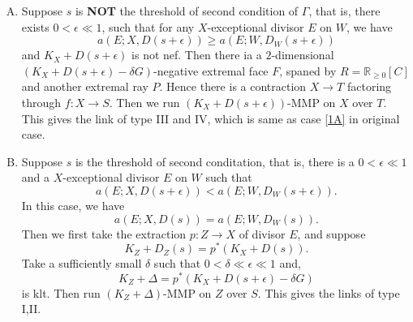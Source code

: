 \documentclass{article}
\begin{document}
\begin{enumerate}[(A)]
  \item Suppose $s$ is \textbf{NOT} the threshold of second condition of $\Gamma$, that is, there exists $0<\epsilon\ll 1$, such that for any $X$-exceptional divisor $E$ on $W$, we have
    \[
      a(E;X,D(s+\epsilon))\geqslant a(E;W,D_{W}(s+\epsilon))
    \]
    and $K_{X}+D(s+\epsilon)$ is not nef. Then there ia a $2$-dimensional $(K_{X}+D(s+\epsilon)-\delta G)$-negative extremal face $F$, spaned by $R=\mathbb{R}_{\geqslant 0}[C]$ and another extremal ray $P$. Hence there is a contraction $X\to T$ factoring through $f:X\to S$. Then we run $(K_{X}+D(s+\epsilon))$-MMP on $X$ over $T$. This gives the link of type III and IV, which is same as case \ref{1A} in original case.
  \item Suppose $s$ is the threshold of second conditation, that is, there is a $0<\epsilon \ll 1$ and a $X$-exceptional divisor $E$ on $W$ such that 
    \[
      a(E;X,D(s+\epsilon))< a(E;W,D_{W}(s+\epsilon))
    .\]
   In this case, we have 
    \[
      a(E;X,D(s))= a(E;W,D_{W}(s))
    .\]
    Then we first take the extraction $p:Z\to X$ of divisor $E$, and suppose
    \[
      K_{Z}+D_{Z}(s)=p^*(K_{X}+D(s))
    .\]
   Take a sufficiently small $\delta$ such that $0<\delta \ll \epsilon \ll 1$ and,
   \[
     K_{Z}+\Delta=p^*(K_{X}+D(s+\epsilon)-\delta G)
   \]
  is klt. Then run $(K_{Z}+\Delta)$-MMP on $Z$ over $S$. This gives the links of type I,II.    
\end{enumerate}
\end{document}
